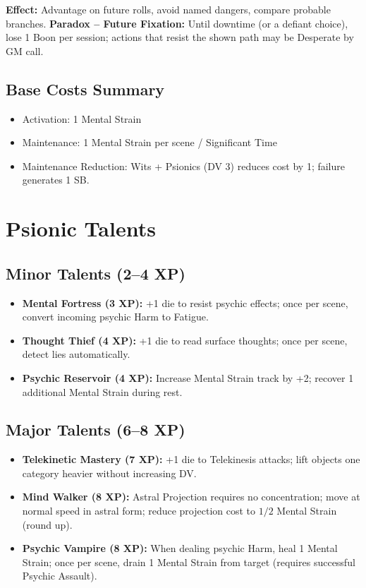 \documentclass[10pt,a5paper]{book}
\begin{document}
\textbf{Effect:} Advantage on future rolls, avoid named dangers, compare probable branches. \textbf{Paradox -- Future Fixation:} Until downtime (or a defiant choice), lose 1 Boon per session; actions that resist the shown path may be Desperate by GM call.

\subsection{Base Costs Summary}
\begin{itemize}
    \item Activation: 1 Mental Strain
    \item Maintenance: 1 Mental Strain per scene / Significant Time
    \item Maintenance Reduction: Wits + Psionics (DV 3) reduces cost by 1; failure generates 1 SB.
\end{itemize}

\section{Psionic Talents}

\subsection{Minor Talents (2--4 XP)}
\begin{itemize}
    \item \textbf{Mental Fortress (3 XP):} +1 die to resist psychic effects; once per scene, convert incoming psychic Harm to Fatigue.
    \item \textbf{Thought Thief (4 XP):} +1 die to read surface thoughts; once per scene, detect lies automatically.
    \item \textbf{Psychic Reservoir (4 XP):} Increase Mental Strain track by +2; recover 1 additional Mental Strain during rest.
\end{itemize}

\subsection{Major Talents (6--8 XP)}
\begin{itemize}
    \item \textbf{Telekinetic Mastery (7 XP):} +1 die to Telekinesis attacks; lift objects one category heavier without increasing DV.
    \item \textbf{Mind Walker (8 XP):} Astral Projection requires no concentration; move at normal speed in astral form; reduce projection cost to \(1/2\) Mental Strain (round up).
    \item \textbf{Psychic Vampire (8 XP):} When dealing psychic Harm, heal 1 Mental Strain; once per scene, drain 1 Mental Strain from target (requires successful Psychic Assault).
\end{itemize}
\end{document}
